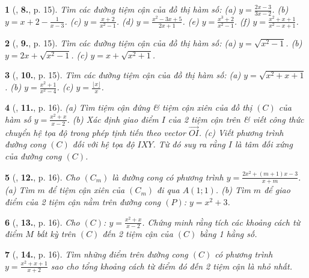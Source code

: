\documentclass{article}
\newtheorem{baitoan}{}
\begin{document}
\begin{baitoan}[\cite{TLCT_giai_tich_12}, \textbf{8.}, p. 15]
	Tìm các đường tiệm cận của đồ thị hàm số: (a) $y = \frac{2x - 3}{3x - 2}$. (b) $y = x + 2 - \frac{1}{x - 3}$. (c) $y = \frac{x + 2}{x^2 - 1}$. (d) $y = \frac{x^2 - 3x + 5}{2x + 1}$. (e) $y = \frac{x^3 + 2}{x^2 - 1}$. (f) $y = \frac{x^2 + x + 1}{x^2 - x + 1}$.	
\end{baitoan}

\begin{baitoan}[\cite{TLCT_giai_tich_12}, \textbf{9.}, p. 15]
	Tìm các đường tiệm cận của đồ thị hàm số: (a) $y = \sqrt{x^2 - 1}$. (b) $y = 2x + \sqrt{x^2 - 1}$. (c) $y = x + \sqrt{x^2 + 1}$.	
\end{baitoan}

\begin{baitoan}[\cite{TLCT_giai_tich_12}, \textbf{10.}, p. 15]
	Tìm các đường tiệm cận của đồ thị hàm số: (a) $y = \sqrt{x^2 + x + 1}$. (b) $y = \frac{x^2 + 1}{x^2 - 4}$. (c) $y = \frac{\lfloor x\rfloor}{x}$.	
\end{baitoan}

\begin{baitoan}[\cite{TLCT_giai_tich_12}, \textbf{11.}, p. 16]	
	(a) Tìm tiệm cận đứng \& tiệm cận xiên của đồ thị $(C)$ của hàm số $y = \frac{x^2 + x}{x - 2}$. (b) Xác định giao điểm $I$ của 2 tiệm cận trên \& viết công thức chuyển hệ tọa độ trong phép tịnh tiến theo vector $\overrightarrow{OI}$. (c) Viết phương trình đường cong $(C)$ đối với hệ tọa độ $IXY$. Từ đó suy ra rằng $I$ là tâm đối xứng của đường cong $(C)$.
\end{baitoan}

\begin{baitoan}[\cite{TLCT_giai_tich_12}, \textbf{12.}, p. 16]
	Cho $(C_m)$ là đường cong có phương trình $y = \frac{2x^2 + (m + 1)x - 3}{x + m}$. (a) Tìm $m$ để tiệm cận xiên của $(C_m)$ đi qua $A(1;1)$. (b) Tìm $m$ để giao điểm của 2 tiệm cận nằm trên đường cong $(P)$: $y = x^2 + 3$.	
\end{baitoan}

\begin{baitoan}[\cite{TLCT_giai_tich_12}, \textbf{13.}, p. 16]
	Cho $(C)$: $y = \frac{x^2 + x}{x - 2}$. Chứng minh rằng tích các khoảng cách từ điểm $M$ bất kỳ trên $(C)$ đến 2 tiệm cận của $(C)$ bằng 1 hằng số.
\end{baitoan}

\begin{baitoan}[\cite{TLCT_giai_tich_12}, \textbf{14.}, p. 16]
	Tìm những điểm trên đường cong $(C)$ có phương trình $y = \frac{x^2 + x + 1}{x + 2}$ sao cho tổng khoảng cách từ điểm đó đến 2 tiệm cận là nhỏ nhất.
\end{baitoan}
\end{document}
